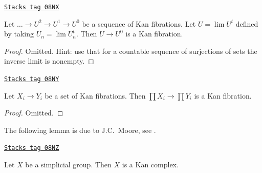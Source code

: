 \begin{lemma}
\label{simplicial-lemma-limit-kan}
\href{https://stacks.math.columbia.edu/tag/08NX}{\texttt{Stacks tag 08NX}}

Let $\ldots \to U^2 \to U^1 \to U^0$ be a sequence of Kan
fibrations. Let $U = \lim U^t$ defined by taking $U_n = \lim U_n^t$.
Then $U \to U^0$ is a Kan fibration.
\end{lemma}

\begin{proof}
Omitted. Hint: use that for a countable sequence of surjections of sets
the inverse limit is nonempty.
\end{proof}

\begin{lemma}
\label{simplicial-lemma-product-kan}
\href{https://stacks.math.columbia.edu/tag/08NY}{\texttt{Stacks tag 08NY}}

Let $X_i \to Y_i$ be a set of Kan fibrations. Then
$\prod X_i \to \prod Y_i$ is a Kan fibration.
\end{lemma}

\begin{proof}
Omitted.
\end{proof}

The following lemma is due to J.C.\ Moore, see \cite{Moore-Cartan}.

\begin{lemma}
\label{simplicial-lemma-simplicial-group-kan}
\href{https://stacks.math.columbia.edu/tag/08NZ}{\texttt{Stacks tag 08NZ}}

Let $X$ be a simplicial group. Then $X$ is a Kan complex.
\end{lemma}

